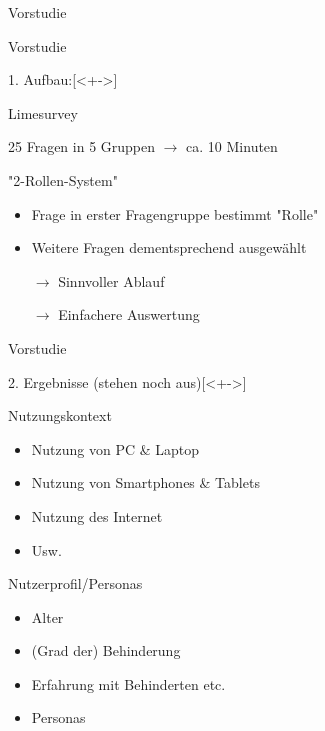 \begin{subsection}{Vorstudie}
\begin{frame}{Vorstudie}


\begin{titleditems}{1. Aufbau:}[<+->]
\pause
\item Limesurvey \cite{limesurvey}
\item 25 Fragen in 5 Gruppen $\rightarrow$ ca. 10 Minuten
\item "2-Rollen-System"
	\pause
	\begin{itemize}
	\item Frage in erster Fragengruppe bestimmt "Rolle"
	\item Weitere Fragen dementsprechend ausgewählt
	\item[$\rightarrow$]Sinnvoller Ablauf
	\item[$\rightarrow$]Einfachere Auswertung
	\end{itemize}
\end{titleditems}

\end{frame}


\begin{frame}{Vorstudie}


\begin{titleditems}{2. Ergebnisse (stehen noch aus)}[<+->]
\pause
\item Nutzungskontext
	\pause
	\begin{itemize}
	\item Nutzung von PC \& Laptop
	\item Nutzung von Smartphones \& Tablets
	\item Nutzung des Internet
	\item Usw.
	\end{itemize}
	
\item Nutzerprofil/Personas
	\pause
	\begin{itemize}
	\item Alter
	\item (Grad der) Behinderung
	\item Erfahrung mit Behinderten etc.
	\item Personas
	\end{itemize}
	
\end{titleditems}

\end{frame}

\end{subsection} %


